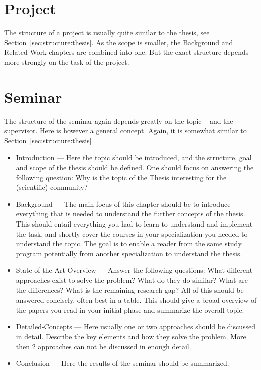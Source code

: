 \section{Project}
\label{sec:structure:project}
The structure of a project is usually quite similar to the thesis, see Section~\ref{sec:structure:thesis}. As the scope is smaller, the Background and Related Work chapters are combined into one. But the exact structure depends more strongly on the task of the project.

\section{Seminar}
\label{sec:structure:seminar}
The structure of the seminar again depends greatly on the topic -- and the supervisor. Here is however a general concept. Again, it is somewhat similar to Section~\ref{sec:structure:thesis}
\begin{itemize}
    \item Introduction --- Here the topic should be introduced, and the structure, goal and scope of the thesis should be defined. One should focus on answering the following question: Why is the topic of the Thesis interesting for the (scientific) community?
    \item Background --- The main focus of this chapter should be to introduce everything that is needed to understand the further concepts of the thesis. This should entail everything you had to learn to understand and implement the task, and shortly cover the courses in your specialization you needed to understand the topic. The goal is to enable a reader from the same study program potentially from another specialization to understand the thesis.
    \item State-of-the-Art Overview --- Answer the following questions: What different approaches exist to solve the problem? What do they do similar? What are the differences? What is the remaining research gap? All of this should be answered concisely, often best in a table. This should give a broad overview of the papers you read in your initial phase and summarize the overall topic. 
    \item Detailed-Concepts --- Here usually one or two approaches should be discussed in detail. Describe the key elements and how they solve the problem. More then 2 approaches can not be discussed in enough detail.
    \item Conclusion --- Here the results of the seminar should be summarized.
\end{itemize}

